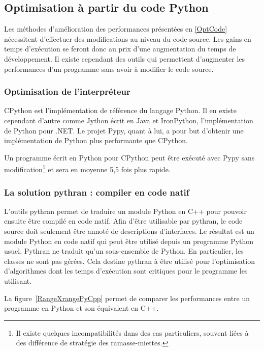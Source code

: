 \documentclass[a4paper]{article}
\begin{document}
\subsection{Optimisation à partir du code Python}

Les méthodes d'amélioration des performances présentées en
\ref{OptCode} nécessitent d'effectuer des modifications au niveau du
code source. Les gains en temps d'exécution se feront donc au prix
d'une augmentation du temps de développement. Il existe cependant des
outils qui permettent d'augmenter les performances d'un programme sans
avoir à modifier le code source.

\subsubsection{Optimisation de l'interpréteur}

CPython est l'implémentation de référence du langage Python. Il en
existe cependant d'autre comme Jython écrit en Java et IronPython,
l'implémentation de Python pour .NET. Le projet Pypy, quant à lui, a
pour but d'obtenir une implémentation de Python plus performante que
CPython.

Un programme écrit en Python pour CPython peut être exécuté avec Pypy
sans modification\footnote{Il existe quelques incompatibilités dans
  des cas particuliers, souvent liées à des différence de stratégie
  des ramasse-miettes\cite{PypyDiff}.} et sera en moyenne 5,5 fois
plus rapide\cite{PypySpeed}.

\subsubsection{La solution pythran : compiler en code natif}

L'outils pythran permet de traduire un module Python en C++ pour
pouvoir ensuite être compilé en code natif. Afin d'être utilisable par
pythran, le code source doit seulement être annoté de descriptions
d'interfaces. Le résultat est un module Python en code natif qui peut
être utilisé depuis un programme Python usuel. Pythran ne traduit
qu'un sous-ensemble de Python. En particulier, les classes ne sont pas
gérées. Cela destine pythran à être utilisé pour l'optimisation
d'algorithmes dont les temps d'exécution sont critiques pour le
programme les utilisant.

La figure~\ref{RangeXrangePyCpp} permet de comparer les performances
entre un programme en Python et son équivalent en C++.
\end{document}
